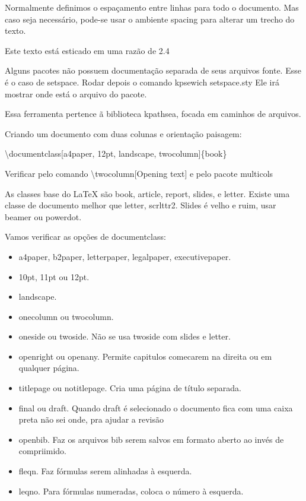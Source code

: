 \documentclass[a4paper, 12pts]{book}
\begin{document}
Normalmente definimos o espaçamento entre linhas para todo o documento.
Mas caso seja necessário, pode-se usar o ambiente spacing para alterar um trecho do texto.

\begin{spacing}{2.4}
    Este texto está esticado em uma razão de 2.4
\end{spacing}

Alguns pacotes não possuem documentação separada de seus arquivos fonte.
Esse é o caso de setspace.
Rodar depois o comando kpsewich setspace.sty
Ele irá mostrar onde está o arquivo do pacote.

Essa ferramenta pertence ã biblioteca kpathsea, focada em caminhos de arquivos.

Criando um documento com duas colunas e orientação paisagem:

\textbackslash documentclass[a4paper, 12pt, landscape, twocolumn]\{book\}

Verificar pelo comando \textbackslash twocolumn[Opening text]
e pelo pacote multicols

As classes base do LaTeX são book, article, report, slides, e letter.
Existe uma classe de documento melhor que letter, scrlttr2. Slides é velho e ruim, usar beamer ou powerdot.


Vamos verificar as opções de documentclass:
\begin{itemize}
    \item a4paper, b2paper, letterpaper, legalpaper, executivepaper.
    \item 10pt, 11pt ou 12pt. 
    \item landscape.
    \item onecolumn ou twocolumn.
    \item oneside ou twoside. Não se usa twoside com slides e letter.
    \item openright ou openany. Permite capitulos comecarem na direita ou em qualquer página.
    \item titlepage ou notitlepage. Cria uma página de título separada.
    \item final ou draft. Quando draft é selecionado o documento fica com uma caixa preta não sei onde, pra ajudar a revisão
    \item openbib. Faz os arquivos bib serem salvos em formato aberto ao invés de compriimido.
    \item fleqn. Faz fórmulas serem alinhadas à esquerda.
    \item leqno. Para fórmulas numeradas, coloca o número à esquerda.
\end{itemize}
\end{document}
